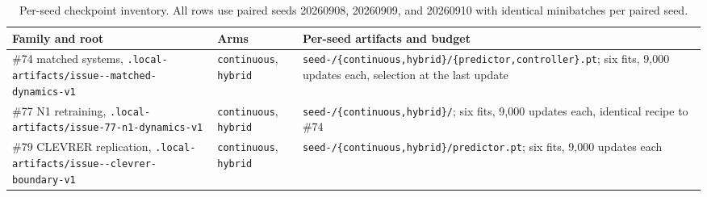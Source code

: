 \begin{table}[t]
\centering
\small
\caption{Per-seed checkpoint inventory. All rows use paired seeds 20260908, 20260909, and 20260910 with identical minibatches per paired seed.}
\label{tab:app:checkpoints}
\begin{tabular}{@{}p{}p{}p{}@{}}
\toprule
Family and root & Arms & Per-seed artifacts and budget \\
\midrule
\#74 matched systems, \texttt{.local-artifacts/}\newline\texttt{issue-\allowbreak 74-\allowbreak matched-\allowbreak dynamics-\allowbreak v1} & \texttt{continuous}, \texttt{hybrid} & \texttt{seed-\allowbreak */\allowbreak \{continuous,hybrid\}/}\newline\texttt{\{predictor,controller\}.pt}; six fits, 9{,}000 updates each, selection at the last update \\
\#77 N1 retraining, \texttt{.local-artifacts/}\newline\texttt{issue-77-n1-dynamics-v1} & \texttt{continuous}, \texttt{hybrid} & \texttt{seed-\allowbreak */\allowbreak \{continuous,hybrid\}/}; six fits, 9{,}000 updates each, identical recipe to \#74 \\
\#79 CLEVRER replication, \texttt{.local-artifacts/}\newline\texttt{issue-\allowbreak 79-\allowbreak clevrer-\allowbreak boundary-\allowbreak v1} & \texttt{continuous}, \texttt{hybrid} & \texttt{seed-\allowbreak */\allowbreak \{continuous,hybrid\}/}\newline\texttt{predictor.pt}; six fits, 9{,}000 updates each \\
\bottomrule
\end{tabular}
\end{table}

